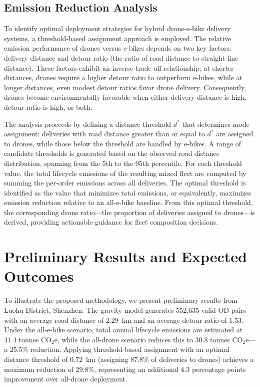 \documentclass[11pt]{article}
\begin{document}
\subsection{Emission Reduction Analysis}

To identify optimal deployment strategies for hybrid drone-e-bike delivery systems, a threshold-based assignment approach is employed. The relative emission performance of drones versus e-bikes depends on two key factors: delivery distance and detour ratio (the ratio of road distance to straight-line distance). These factors exhibit an inverse trade-off relationship: at shorter distances, drones require a higher detour ratio to outperform e-bikes, while at longer distances, even modest detour ratios favor drone delivery. Consequently, drones become environmentally favorable when either delivery distance is high, detour ratio is high, or both.

The analysis proceeds by defining a distance threshold $d^*$ that determines mode assignment: deliveries with road distance greater than or equal to $d^*$ are assigned to drones, while those below the threshold are handled by e-bikes. A range of candidate thresholds is generated based on the observed road distance distribution, spanning from the 5th to the 95th percentile. For each threshold value, the total lifecycle emissions of the resulting mixed fleet are computed by summing the per-order emissions across all deliveries. The optimal threshold is identified as the value that minimizes total emissions, or equivalently, maximizes emission reduction relative to an all-e-bike baseline. From this optimal threshold, the corresponding drone ratio—the proportion of deliveries assigned to drones—is derived, providing actionable guidance for fleet composition decisions.

\section{Preliminary Results and Expected Outcomes}

To illustrate the proposed methodology, we present preliminary results from Luohu District, Shenzhen. The gravity model generates 552,635 valid OD pairs with an average road distance of 2.29~km and an average detour ratio of 1.53. Under the all-e-bike scenario, total annual lifecycle emissions are estimated at 41.4 tonnes CO$_2$e, while the all-drone scenario reduces this to 30.8 tonnes CO$_2$e---a 25.5\% reduction. Applying threshold-based assignment with an optimal distance threshold of 0.72~km (assigning 87.8\% of deliveries to drones) achieves a maximum reduction of 29.8\%, representing an additional 4.3 percentage points improvement over all-drone deployment.
\end{document}
